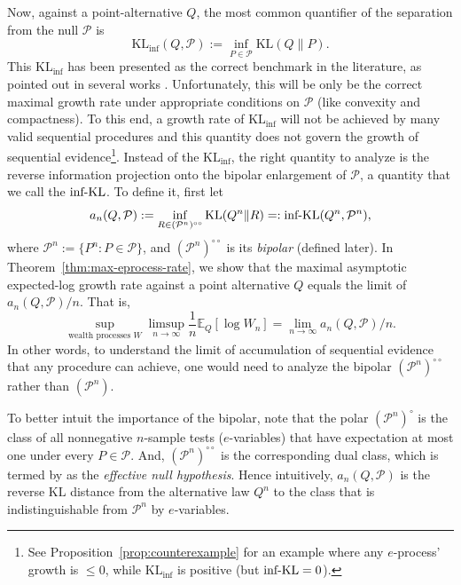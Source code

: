 \documentclass[11pt]{article}
\newcommand{\KL}{\mathrm{KL}}
\newcommand{\KLinf}{\mathrm{KL}_{\mathrm{inf}}}
\newcommand{\infKL}{\textnormal{inf-KL}}
\newcommand{\E}{\mathbb{E}}
\newcommand{\Pcal}{\mathcal{P}}
\theoremstyle{definition}
\theoremstyle{definition}
\begin{document}
Now, against a point-alternative $Q$, the most common quantifier of the separation from the null $\Pcal$ is
\[
\KLinf(Q,\Pcal):=\inf_{P\in\Pcal}\KL(Q\|P).
\]
This $\KLinf$ has been presented as the correct benchmark in the literature, as pointed out in several works \cite{agrawal2025stoppingtimespoweronesequential, ram2026asymptoticallyoptimalsequentialchange, sethi2026asymptoticallyoptimalsequentialtesting, shekhar2025optimalanytimevalidtestscomposite}. Unfortunately, this will be only be the correct maximal growth rate under appropriate conditions on $\Pcal$ (like convexity and compactness). To this end, a growth rate of $\KLinf$ will not be achieved by many valid sequential procedures and this quantity does not govern the growth of sequential evidence\footnote{See Proposition~\ref{prop:counterexample} for an example where any $e$-process' growth is $\leq 0$, while  $\KLinf$ is positive (but $\infKL=0$).}. Instead of the $\KLinf$, the right quantity to analyze is the reverse information projection \parencite{larsson2025numeraire} onto the bipolar enlargement of $\Pcal$, a quantity that we call the $\infKL$. To define it, first let
\[
a_n(Q,\Pcal):=\inf_{R\in(\Pcal^n)^{\circ\circ}}\KL(Q^n\|R) =: \infKL(Q^n,\Pcal^n),
\]
where $\Pcal^n := \{P^n : P \in \Pcal \}$, and $(\Pcal^n)^{\circ\circ}$ is its \emph{bipolar} (defined later).
In Theorem~\ref{thm:max-eprocess-rate}, we show that the maximal asymptotic expected-log growth rate against a point alternative $Q$ equals the limit of  $a_n(Q,\Pcal)/n$. That is,
$$
 \sup_{\text{wealth processes } W} \limsup_{n \to \infty} \frac1n \E_Q[\log W_n]   = \lim_{n\to \infty} a_n(Q,\Pcal)/n.
$$ 
In other words, to understand the limit of accumulation of sequential evidence that any procedure can achieve, one would need to analyze the bipolar $(\Pcal^n)^{\circ\circ}$ rather than $(\Pcal^n)$.

To better intuit the importance of the bipolar, note that the polar $(\Pcal^n)^{\circ}$ is the class of all nonnegative $n$-sample tests ($e$-variables) that have expectation at most one under every $P\in\Pcal$. And, $(\Pcal^n)^{\circ\circ}$ is the corresponding dual class, which is termed by \cite{larsson2025numeraire} as the \emph{effective null hypothesis}. Hence intuitively, $a_n(Q,\Pcal)$ is the reverse $\KL$ distance from the alternative law $Q^n$ to the class that is indistinguishable from $\Pcal^n$ by $e$-variables. 
\end{document}
